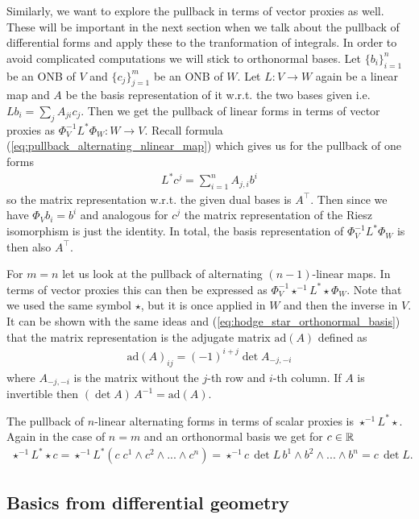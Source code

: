 \documentclass[../master_thesis.tex]{subfiles}
\begin{document}
Similarly, we want to explore the pullback in terms of vector proxies as well. 
These will be important in the next section when we talk about the pullback 
of differential forms and apply these to the tranformation of integrals.
In order to avoid complicated computations we will stick to orthonormal bases.
Let $\{ b_i \}_{i=1}^n$ be an ONB of $V$ and 
$\{ c_j \}_{j=1}^m$ be an ONB of $W$. Let $L : V \rightarrow W$ 
again be a linear map and $A$ be the basis representation of it w.r.t. 
the two bases given i.e. $L b_i = \sum_j A_{ji} c_j$. 
Then we get the pullback of linear forms in terms 
of vector proxies 
as $\Phi_V^{-1} L^* \Phi_W : W \rightarrow V$. Recall 
formula (\ref{eq:pullback_alternating_nlinear_map}) which 
gives us for the pullback of one forms 
\begin{align}
    L^* c^j = \sum_{i=1}^n A_{j,i} b^i \label{eq:pullback_linear_forms}
\end{align}
so the matrix representation w.r.t. the given dual bases is $A^\top$.
Then since we have $\Phi_V b_i = b^i$ and analogous for $c^j$
the matrix representation of the Riesz isomorphism is just the identity.
In total, the basis representation of $\Phi_V^{-1} L^* \Phi_W$ is then also 
$A^\top$.

For $m=n$ let us look at the pullback of alternating $(n-1)$-linear maps.
In terms of vector proxies this can then be expressed as 
$\Phi_V^{-1} \star^{-1} L^* \star \Phi_W$. Note that we used the same symbol 
$\star$, but it is once applied in $W$ and then the inverse in $V$. It 
can be shown with the same ideas and (\ref{eq:hodge_star_orthonormal_basis})
that the matrix representation is the adjugate matrix 
$\text{ad}(A)$ defined as 
\begin{align*}
    \text{ad}(A)_{ij} = (-1)^{i+j} \det A_{-j,-i}
\end{align*} 
where $A_{-j,-i}$ is the matrix without the $j$-th row and $i$-th column.
If $A$ is invertible then $(\det A)\,A^{-1} =  \text{ad}(A)$. 

The pullback of $n$-linear alternating forms in terms of scalar proxies is 
$\star^{-1} L^* \star$. Again in the case of $n=m$ and an 
orthonormal basis we get for $c \in \mathbb{R}$
\begin{align*}
    \star^{-1} L^* \star c = \star^{-1} L^* (c \; c^1 \wedge c^2 \wedge ... \wedge c^n)
    = \star^{-1} c\,\det L \,b^1 \wedge b^2 \wedge ... \wedge b^n = c\,\det L.
\end{align*}

\subsection{Basics from differential geometry}\label{sec:differential_geometry}
\end{document}

